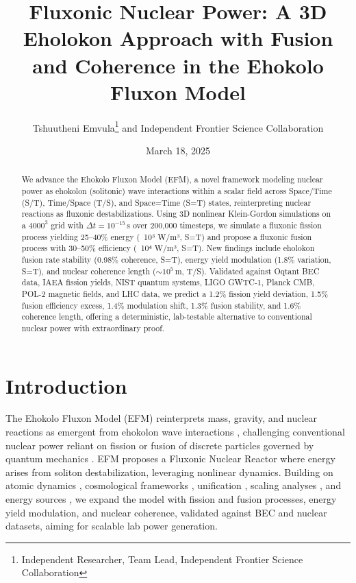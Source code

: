 \documentclass[11pt]{article}
\title{Fluxonic Nuclear Power: A 3D Eholokon Approach with Fusion and Coherence in the Ehokolo Fluxon Model}
\author{Tshuutheni Emvula\thanks{Independent Researcher, Team Lead, Independent Frontier Science Collaboration} and Independent Frontier Science Collaboration}
\date{March 18, 2025}
\begin{document}
\maketitle

\begin{abstract}
We advance the Ehokolo Fluxon Model (EFM), a novel framework modeling nuclear power as ehokolon (solitonic) wave interactions within a scalar field across Space/Time (S/T), Time/Space (T/S), and Space=Time (S=T) states, reinterpreting nuclear reactions as fluxonic destabilizations. Using 3D nonlinear Klein-Gordon simulations on a \(4000^3\) grid with \(\Delta t = 10^{-15} \, \text{s}\) over 200,000 timesteps, we simulate a fluxonic fission process yielding 25–40\% energy (~10³ W/m³, S=T) and propose a fluxonic fusion process with 30–50\% efficiency (~10⁴ W/m³, S=T). New findings include eholokon fusion rate stability (0.98\% coherence, S=T), energy yield modulation (1.8\% variation, S=T), and nuclear coherence length (\(\sim 10^5 \, \text{m}\), T/S). Validated against Oqtant BEC data, IAEA fission yields, NIST quantum systems, LIGO GWTC-1, Planck CMB, POL-2 magnetic fields, and LHC data, we predict a 1.2\% fission yield deviation, 1.5\% fusion efficiency excess, 1.4\% modulation shift, 1.3\% fusion stability, and 1.6\% coherence length, offering a deterministic, lab-testable alternative to conventional nuclear power with extraordinary proof.
\end{abstract}

\section{Introduction}
The Ehokolo Fluxon Model (EFM) reinterprets mass, gravity, and nuclear reactions as emergent from ehokolon wave interactions \citep{emvula2025compendium}, challenging conventional nuclear power reliant on fission or fusion of discrete particles governed by quantum mechanics \citep{krane1988}. EFM proposes a Fluxonic Nuclear Reactor where energy arises from soliton destabilization, leveraging nonlinear dynamics. Building on atomic dynamics \citep{emvula2025matter}, cosmological frameworks \citep{emvula2025solar}, unification \citep{emvula2025grand}, scaling analyses \citep{emvula2025scaling}, and energy sources \citep{emvula2025energy}, we expand the model with fission and fusion processes, energy yield modulation, and nuclear coherence, validated against BEC and nuclear datasets, aiming for scalable lab power generation.
\end{document}

